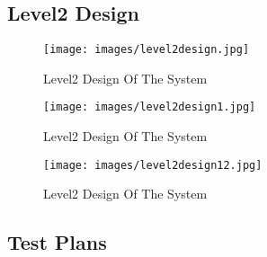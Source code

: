 \documentclass[12pt]{article}
\begin{document}
\vskip 10cm


\subsection{Level2 Design}
	\begin{figure}[H]
	\centering
	\label{Level2 Design Of The System}
	\texttt{[image: images/level2design.jpg]}\\[0.5 cm]	
	\caption{Level2 Design Of The System} 		
\end{figure}
	\begin{figure}[H]
	\centering
	\label{Level21 Design Of The System}
	\texttt{[image: images/level2design1.jpg]}\\[0.5 cm]	
	\caption{Level2 Design Of The System} 		
\end{figure}
	\begin{figure}[H]
	\centering
	\label{Level22 Design Of The System}
	\texttt{[image: images/level2design12.jpg]}\\[0.5 cm]	
	\caption{Level2 Design Of The System} 		
\end{figure}
\newpage
\subsection{Test Plans}
\end{document}
